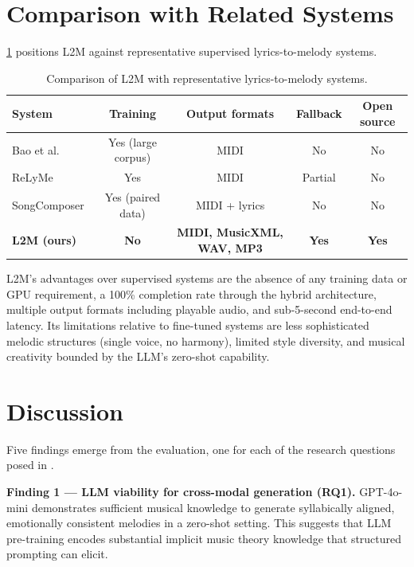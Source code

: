 \section{Comparison with Related Systems}
\label{sec:ev-comparison}

\ref{tab:comparison} positions L2M against representative supervised
lyrics-to-melody systems.

\begin{table}[ht]
\centering
\caption[Comparison with related systems]{Comparison of L2M with
representative lyrics-to-melody systems.}
\label{tab:comparison}
\begin{tabular}{l c c c c}
\toprule
\textbf{System} & \textbf{Training} & \textbf{Output formats} &
\textbf{Fallback} & \textbf{Open source} \\
\midrule
Bao et al.~\cite{bao19neural} & Yes (large corpus) & MIDI & No & No \\
ReLyMe~\cite{zhang22relyme} & Yes & MIDI & Partial & No \\
SongComposer~\cite{ding24songcomposer} & Yes (paired data) & MIDI + lyrics &
No & No \\
\textbf{L2M (ours)} & \textbf{No} & \textbf{MIDI, MusicXML, WAV, MP3} &
\textbf{Yes} & \textbf{Yes} \\
\bottomrule
\end{tabular}
\end{table}

L2M's advantages over supervised systems are the absence of any training
data or GPU requirement, a 100\% completion rate through the hybrid
architecture, multiple output formats including playable audio, and
sub-5-second end-to-end latency. Its limitations relative to fine-tuned
systems are less sophisticated melodic structures (single voice, no
harmony), limited style diversity, and musical creativity bounded by the
LLM's zero-shot capability.

\section{Discussion}
\label{sec:ev-discussion}

Five findings emerge from the evaluation, one for each of the research
questions posed in .

\textbf{Finding 1 --- LLM viability for cross-modal generation (RQ1).}
GPT-4o-mini demonstrates sufficient musical knowledge to generate
syllabically aligned, emotionally consistent melodies in a zero-shot
setting. This suggests that LLM pre-training encodes substantial implicit
music theory knowledge that structured prompting can elicit.

